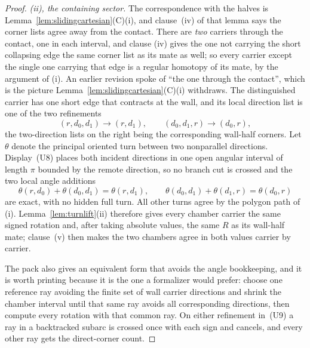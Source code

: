 \begin{proof}
\emph{(ii), the containing sector.} The correspondence with the halves is
Lemma~\ref{lem:slidingcartesian}(C)(i), and clause~(iv) of that lemma says the corner
lists agree away from the contact. There are \emph{two} carriers through the
contact, one in each interval, and clause (iv) gives the one not carrying the
short collapsing edge the same corner list as its mate as well; so every carrier
except the single one carrying that edge is a regular homotopy of its mate, by
the argument of (i). An earlier revision spoke of ``the one through the
contact'', which is the picture Lemma~\ref{lem:slidingcartesian}(C)(i) withdraws. The
distinguished carrier has one short edge that contracts
at the wall, and its local direction list is one of the two refinements
\begin{equation}
   (r,d_0,d_1)\longrightarrow(r,d_1),
   \qquad
   (d_0,d_1,r)\longrightarrow(d_0,r),
   \tag{U9}
\end{equation}
the two-direction lists on the right being the corresponding wall-half corners.
Let $\theta$ denote the principal oriented turn between two nonparallel
directions. Display~(U8) places both incident directions in one open angular
interval of length $\pi$ bounded by the remote direction, so no branch cut is
crossed and the two local angle additions
\begin{equation}
   \theta(r,d_0)+\theta(d_0,d_1)=\theta(r,d_1),
   \qquad
   \theta(d_0,d_1)+\theta(d_1,r)=\theta(d_0,r)
   \tag{U10}
\end{equation}
are exact, with no hidden full turn. All other turns agree by the polygon
path of (i). Lemma~\ref{lem:turnlift}(ii) therefore gives every chamber
carrier the same signed rotation and,
after taking absolute values, the same $R$ as its wall-half mate; clause~(v)
then makes the two chambers agree in both values carrier by carrier.

The pack also gives an equivalent form that avoids the angle bookkeeping, and it
is worth printing because it is the one a formalizer would prefer: choose one
reference ray avoiding the finite set of wall carrier directions and shrink the
chamber interval until that same ray avoids all corresponding directions, then
compute every rotation with that common ray. On either refinement in~(U9) a ray
in a backtracked subarc is crossed once with each sign and cancels, and every
other ray gets the direct-corner count.


\end{proof}
